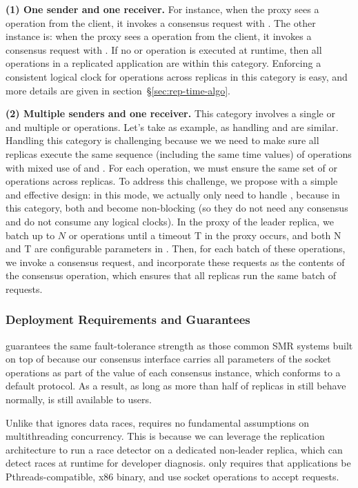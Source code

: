\textbf{(1) One sender and one receiver.} For instance, when the proxy sees a
\connect operation from the client, it invokes a consensus request with \accept.
The other instance is: when the proxy sees a \send operation from the client, it
invokes a consensus request with \recv. If no \select or \poll operation is
executed at runtime, then all operations in a replicated application are within
this category. Enforcing a consistent logical clock for operations across
replicas in this category is easy, and more details are given in
section~\S\ref{sec:rep-time-algo}.

\textbf{(2) Multiple senders and one receiver.} This category involves a single
\select or \poll and multiple \send or \connect operations. Let's take \select
as example, as handling \poll and \epoll are similar. Handling this category is
challenging because we we need to make sure 
all replicas execute the same sequence (including the same time values) of
\select operations with mixed use of \recv and \accept. For each \select
operation, we must ensure the same set of \send or \connect operations across
replicas. To address this challenge, we propose with a simple and effective
design: in this mode, we actually only need to handle \select, because in this
category, both \recv and \accept become non-blocking (so they do not need any
consensus and do not consume any logical clocks). In the proxy of the leader
replica, we batch up to $N$ \send or \connect operations until a timeout T in
the proxy occurs, and both N and T are configurable parameters in \crane. Then,
for each batch of these operations, we invoke a \paxos consensus request, and
incorporate these requests as the contents of the \paxos consensus operation,
which ensures that all replicas run the same batch of requests. 

\subsubsection{Deployment Requirements and Guarantees} 
\label{sec:rep-discussion}

\crane guarantees the same fault-tolerance strength as those common SMR systems
built on top of \paxos because our consensus interface carries all parameters of
the socket operations as part of the value of each \paxos consensus instance,
which conforms to a default \paxos protocol. As a result, as long as more than
half of replicas in \crane still behave normally, \crane is still available to
users.

Unlike \parrot that ignores data races, \crane requires no fundamental
assumptions on multithreading concurrency. This is because we can leverage the
\crane replication architecture to run a race detector on a dedicated non-leader
replica, which can detect races at runtime for developer diagnosis. \crane only
requires that applications be Pthreads-compatible, x86 binary, and use socket
operations to accept requests.

